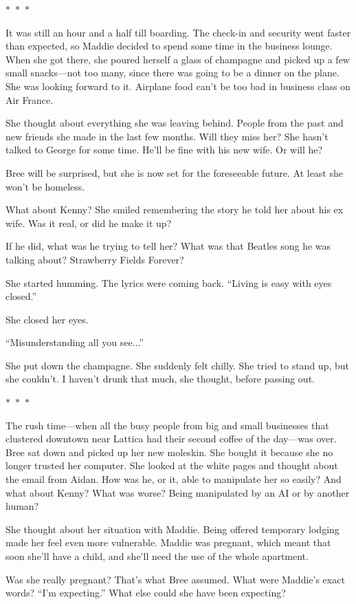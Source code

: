\documentclass{memoir}
\newcommand{\starbreak}{%
\begin{center}
  $\ast$~$\ast$~$\ast$
\end{center}
}
\begin{document}
\starbreak

It was still an hour and a half till boarding. The check-in and security went faster than expected, so Maddie decided to spend some time in the business lounge. When she got there, she poured herself a glass of champagne and picked up a few small snacks---not too many, since there was going to be a dinner on the plane. She was looking forward to it. Airplane food can't be too bad in business class on Air France. 

She thought about everything she was leaving behind. People from the past and new friends she made in the last few months. Will they miss her? She hasn't talked to George for some time. He'll be fine with his new wife. Or will he? 

Bree will be surprised, but she is now set for the foreseeable future. At least she won't be homeless.

What about Kenny? She smiled remembering the story he told her about his ex wife. Was it real, or did he make it up? 

If he did, what was he trying to tell her? What was that Beatles song he was talking about? Strawberry Fields Forever? 

She started humming. The lyrics were coming back. ``Living is easy with eyes closed.'' 

She closed her eyes.

``Misunderstanding all you see...'' 

She put down the champagne. She suddenly felt chilly. She tried to stand up, but she couldn't. I haven't drunk that much, she thought, before passing out.

\starbreak

The rush time---when all the busy people from big and small businesses that clustered downtown near Lattica had their second coffee of the day---was over. Bree sat down and picked up her new moleskin. She bought it because she no longer trusted her computer. She looked at the white pages and thought about the email from Aidan. How was he, or it, able to manipulate her so easily? And what about Kenny? What was worse? Being manipulated by an AI or by another human? 

She thought about her situation with Maddie. Being offered temporary lodging made her feel even more vulnerable. Maddie was pregnant, which meant that soon she'll have a child, and she'll need the use of the whole apartment. 

Was she really pregnant? That's what Bree assumed. What were Maddie's exact words? ``I'm expecting.'' What else could she have been expecting? 
\end{document}
